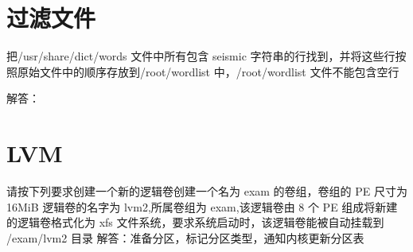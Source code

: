 \documentclass[letterpaper,10pt,english]{sphinxmanual}
\begin{document}
\section{过滤文件}
\label{\detokenize{rhcsa/rhcsa_7:id12}}
把/usr/share/dict/words 文件中所有包含 seismic 字符串的行找到，并将这些行按照原始文件中的顺序存放到/root/wordlist 中，/root/wordlist 文件不能包含空行

解答：

%
\begin{sphinxVerbatim}[commandchars=\\\{\}]
\PYG{p}{[} \PYG{p}{]}
\end{sphinxVerbatim}


\section{LVM}
\label{\detokenize{rhcsa/rhcsa_7:lvm}}
请按下列要求创建一个新的逻辑卷创建一个名为 exam 的卷组，卷组的 PE 尺寸为 16MiB 逻辑卷的名字为 lvm2,所属卷组为 exam,该逻辑卷由 8 个 PE 组成将新建的逻辑卷格式化为 xfs 文件系统，要求系统启动时，该逻辑卷能被自动挂载到
/exam/lvm2 目录
解答：准备分区，标记分区类型，通知内核更新分区表
\end{document}
